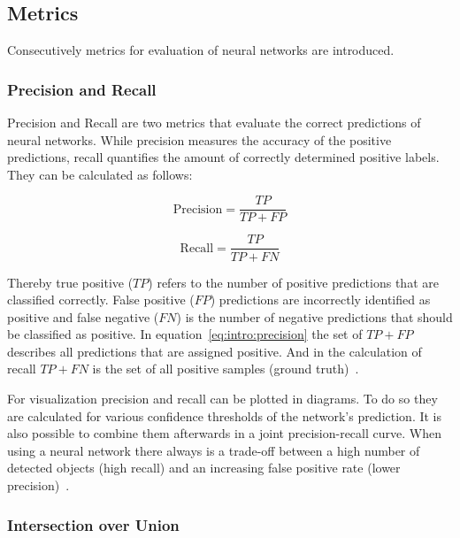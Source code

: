 \subsection{Metrics}\label{subsec:intro:metrics}

Consecutively metrics for evaluation of neural networks are introduced.

\subsubsection*{Precision and Recall}

Precision and Recall are two metrics that evaluate the correct predictions of neural networks. While 
precision measures the accuracy of the positive predictions, recall quantifies the amount of correctly 
determined positive labels. They can be calculated as follows: 

\begin{equation}
	\label{eq:intro:precision}
	\text{Precision} = \frac{TP}{TP + FP}
\end{equation}

\begin{equation}
	\label{eq:intro:recall}
	\text{Recall} = \frac{TP}{TP + FN}
\end{equation}

Thereby true positive ($TP$) refers to the number of positive predictions that are classified 
correctly. False positive ($FP$) predictions are incorrectly identified as positive and false negative 
($FN$) is the number of negative predictions that should be classified as positive. In 
equation~\ref{eq:intro:precision} the set of $TP + FP$ describes all predictions that are assigned 
positive. And in the calculation of recall $TP + FN$ is the set of all positive samples (ground 
truth)~\cite{terven2023, zheng2022}. 

For visualization precision and recall can be plotted in diagrams. To do so they are calculated 
for various confidence thresholds of the network's prediction. It is also possible to combine them 
afterwards in a joint precision-recall curve. When using a neural network there always is a 
trade-off between a high number of detected objects (high recall) and an increasing false positive 
rate (lower precision)~\cite{terven2023}.

\subsubsection*{Intersection over Union}

